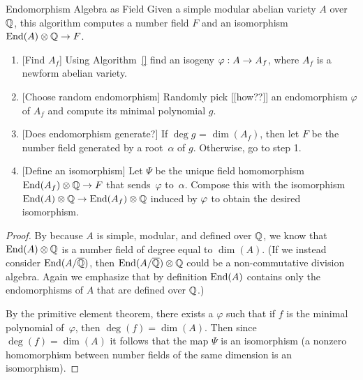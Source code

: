 \documentclass{article}
\begin{document}
\begin{algorithm}{Endomorphism Algebra as Field}
	Given a simple modular abelian variety $A$ over $\mathbb{Q}$,
	this algorithm computes a number field $F$ and an
	isomorphism $\operatorname{End}(A)\otimes\mathbb{Q} \to F$.
	\begin{enumerate}

		\item{} [Find $A_f$] Using Algorithm~\ref{} find an isogeny $\varphi:A\to A_f$,
		      where $A_f$ is a newform abelian variety.

		\item{} [Choose random endomorphism] Randomly pick [[how??]] an endomorphism
		      $\varphi$ of $A_f$ and compute its minimal polynomial $g$.
		\item{} [Does endomorphism generate?]
		      If $\deg g$ = $\dim(A_f)$, then let $F$ be the
		      number field generated by a root~$\alpha$ of $g$.
		      Otherwise, go to step 1.
		\item{} [Define an isomorphism] Let $\Psi$ be the unique field
		      homomorphism $\operatorname{End}(A_f)\otimes\mathbb{Q} \to F$ that sends~$\varphi$
		      to~$\alpha$.  Compose this with the isomorphism
		      $\operatorname{End}(A)\otimes\mathbb{Q} \to \operatorname{End}(A_f)\otimes\mathbb{Q}$ induced by $\varphi$
		      to obtain the desired isomorphism.

	\end{enumerate}
\end{algorithm}
\begin{proof}

	By \cite[???]{ribet:abvars} because $A$ is simple, modular, and defined over $\mathbb{Q}$,
	we know that $\operatorname{End}(A)\otimes\mathbb{Q}$ is a number
	field of degree equal to $\dim(A)$.  (If we instead consider $\operatorname{End}(A/\overline{\mathbb{Q}})$,
	then $\operatorname{End}(A/\overline{\mathbb{Q}})\otimes\mathbb{Q}$ could be a non-commutative division algebra.
	Again we emphasize that by definition $\operatorname{End}(A)$ contains only the endomorphisms
	of $A$ that are defined over $\mathbb{Q}$.)

	By the primitive element theorem, there exists a $\varphi$ such that
	if $f$ is the minimal polynomial of~$\varphi$, then
	$\deg(f) = \dim(A)$.
	Then since $\deg(f) = \dim(A)$ it follows that the
	map $\Psi$ is an isomorphism (a nonzero homomorphism between number
	fields of the same dimension is an isomorphism).
\end{proof}
\end{document}

